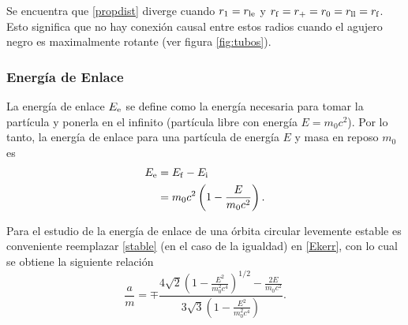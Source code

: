 %


Se encuentra que \eqref{propdist} diverge cuando $r_1=r_{\rm le}$ y $r_{\rm f}=r_{\rm +}=r_{0}=r_{\rm ll}=r_{\rm f}$. Esto significa que no hay conexi\'on causal entre estos radios cuando el agujero negro es maximalmente rotante (ver figura \ref{fig:tubos}).

\subsubsection{Energ\'ia de Enlace}

La energ\'ia de enlace $E_{\rm e}$ se define como la energ\'ia necesaria para tomar la part\'icula y ponerla en el infinito (part\'icula libre con energ\'ia $E=m_0c^2$). Por lo tanto, la energ\'ia de enlace para una part\'icula de energ\'ia $E$ y masa en reposo $m_0$ es
 \begin{equation}
 \begin{aligned}
 E_{\rm e}&=E_{\rm f}-E_{\rm i}\\
 &=m_0c^2\left(1-\frac{E}{m_0c^2}\right).
 \end{aligned}
 \end{equation}
 
Para el estudio de la energ\'ia de enlace de una \'orbita circular levemente estable es conveniente reemplazar  \eqref{stable} (en el caso de la igualdad) en \eqref{Ekerr}, con lo cual se obtiene la siguiente relaci\'on
\begin{equation}
\frac{a}{m}=\mp\frac{4\sqrt{2}\left(1-\frac{E^2}{m_0^2c^4} \right)^{1/2}-\frac{2E}{m_0c^2}}{3\sqrt{3}\left(1-\frac{E^2}{m_0^2c^4} \right)}.
\end{equation}

